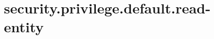 \section{security.privilege.default.read-entity}
\label{configuration:SecurityPrivilegeDefaultReadEntity}
\AvailableInJavaOnly{\TODO}